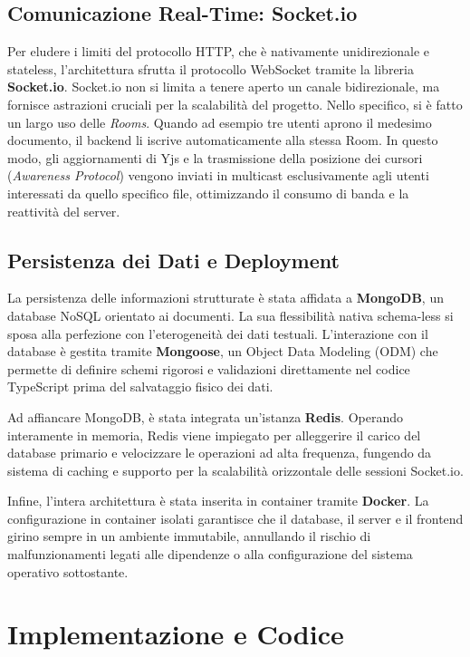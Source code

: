 \documentclass[11pt,a4paper]{report}
\begin{document}
\section{Comunicazione Real-Time: Socket.io}
Per eludere i limiti del protocollo HTTP, che è nativamente unidirezionale e stateless, l'architettura sfrutta il protocollo WebSocket tramite la libreria \textbf{Socket.io}.
Socket.io non si limita a tenere aperto un canale bidirezionale, ma fornisce astrazioni cruciali per la scalabilità del progetto. Nello specifico, si è fatto un largo uso delle \textit{Rooms}. Quando ad esempio tre utenti aprono il medesimo documento, il backend li iscrive automaticamente alla stessa Room. In questo modo, gli aggiornamenti di Yjs e la trasmissione della posizione dei cursori (\textit{Awareness Protocol}) vengono inviati in multicast esclusivamente agli utenti interessati da quello specifico file, ottimizzando il consumo di banda e la reattività del server.

\section{Persistenza dei Dati e Deployment}
La persistenza delle informazioni strutturate è stata affidata a \textbf{MongoDB}, un database NoSQL orientato ai documenti. La sua flessibilità nativa schema-less si sposa alla perfezione con l'eterogeneità dei dati testuali. L'interazione con il database è gestita tramite \textbf{Mongoose}, un Object Data Modeling (ODM) che permette di definire schemi rigorosi e validazioni direttamente nel codice TypeScript prima del salvataggio fisico dei dati.

Ad affiancare MongoDB, è stata integrata un'istanza \textbf{Redis}. Operando interamente in memoria, Redis viene impiegato per alleggerire il carico del database primario e velocizzare le operazioni ad alta frequenza, fungendo da sistema di caching e supporto per la scalabilità orizzontale delle sessioni Socket.io.

Infine, l'intera architettura è stata inserita in container tramite \textbf{Docker}. La configurazione in container isolati garantisce che il database, il server e il frontend girino sempre in un ambiente immutabile, annullando il rischio di malfunzionamenti legati alle dipendenze o alla configurazione del sistema operativo sottostante.

\chapter{Implementazione e Codice}
\end{document}
